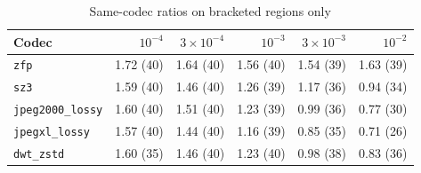 \begin{table}[t]
\centering
\caption{Same-codec ratios on bracketed regions only}
\label{tab:fixed_codec_bracketed}
\footnotesize
\begin{tabular}{@{}lrrrrr@{}}
\toprule
Codec & $10^{-4}$ & $3\times10^{-4}$ & $10^{-3}$ & $3\times10^{-3}$ & $10^{-2}$ \\
\midrule
\texttt{zfp} & 1.72 (40) & 1.64 (40) & 1.56 (40) & 1.54 (39) & 1.63 (39) \\
\texttt{sz3} & 1.59 (40) & 1.46 (40) & 1.26 (39) & 1.17 (36) & 0.94 (34) \\
\texttt{jpeg2000\_lossy} & 1.60 (40) & 1.51 (40) & 1.23 (39) & 0.99 (36) & 0.77 (30) \\
\texttt{jpegxl\_lossy} & 1.57 (40) & 1.44 (40) & 1.16 (39) & 0.85 (35) & 0.71 (26) \\
\texttt{dwt\_zstd} & 1.60 (35) & 1.46 (40) & 1.23 (40) & 0.98 (38) & 0.83 (36) \\
\bottomrule
\end{tabular}
\end{table}
